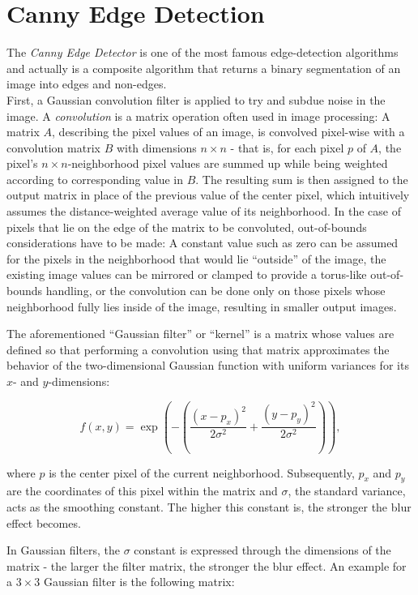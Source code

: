 	\section{Canny Edge Detection}
The \textit{Canny Edge Detector} \cite{canny} is one of the most famous edge-detection algorithms and actually is a composite algorithm that returns a binary segmentation of an image into edges and non-edges.\\

\noindent First, a Gaussian convolution filter is applied to try and subdue noise in the image. A \textit{convolution} is a matrix operation often used in image processing: A matrix $A$, describing the pixel values of an image, is convolved pixel-wise with a convolution matrix $B$ with dimensions $n \times n$ - that is, for each pixel $p$ of $A$, the pixel's $n \times n$-neighborhood pixel values are summed up while being weighted according to corresponding value in $B$. The resulting sum is then assigned to the output matrix in place of the previous value of the center pixel, which intuitively assumes the distance-weighted average value of its neighborhood. In the case of pixels that lie on the edge of the matrix to be convoluted, out-of-bounds considerations have to be made: A constant value such as zero can be assumed for the pixels in the neighborhood that would lie ``outside'' of the image, the existing image values can be mirrored or clamped to provide a torus-like out-of-bounds handling, or the convolution can be done only on those pixels whose neighborhood fully lies inside of the image, resulting in smaller output images.

The aforementioned ``Gaussian filter'' or ``kernel'' is a matrix whose values are defined so that performing a convolution using that matrix approximates the behavior of the two-dimensional Gaussian function with uniform variances for its $x$- and $y$-dimensions:

\[ f(x, y) = \exp \left(- \left( \frac{\left(x - p_x \right)^2}{2\sigma^2} + \frac{ \left(y - p_y \right)^2}{2\sigma^2} \right) \right), \]

\noindent where $p$ is the center pixel of the current neighborhood. Subsequently, $p_x$ and $p_y$ are the coordinates of this pixel within the matrix and $\sigma$, the standard variance, acts as the smoothing constant. The higher this constant is, the stronger the blur effect becomes.

In Gaussian filters, the $\sigma$ constant is expressed through the dimensions of the matrix - the larger the filter matrix, the stronger the blur effect. An example for a $3 \times 3$ Gaussian filter is the following matrix:

